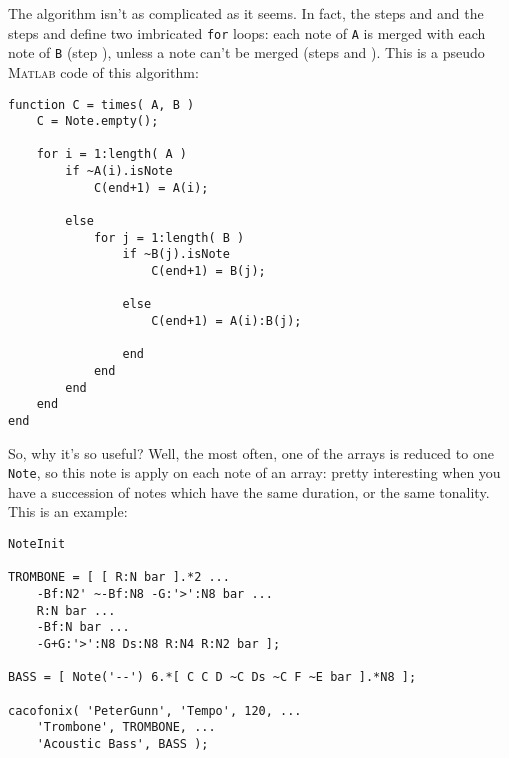 \documentclass{article}
\newcommand{\matlab}{\textsc{Matlab}\xspace}
\newcommand{\note}{\lstinline!Note!\xspace}
\newcommand{\titlealgo}{}
\newcommand{\stepref}[2][]{\ifthenelse{\equal{#1}{}}{\ref{Algo \titlealgo.Step #2}}{\ref{Algo #1.Step #2}}}
\begin{document}
The algorithm isn't as complicated as it seems. In fact, the steps \stepref[T]{checki} and \stepref[T]{inci} and the steps \stepref[T]{checkj} and \stepref[T]{incj} define two imbricated \lstinline!for! loops: each note of \lstinline!A! is merged with each note of \lstinline!B! (step \stepref[T]{addAiBj}), unless a note can't be merged (steps \stepref[T]{addAi} and \stepref[T]{addBj}). This is a pseudo \matlab code of this algorithm:
\begin{lstlisting}
function C = times( A, B )
	C = Note.empty();

	for i = 1:length( A )
		if ~A(i).isNote
			C(end+1) = A(i);

		else
			for j = 1:length( B )
				if ~B(j).isNote
					C(end+1) = B(j);

				else
					C(end+1) = A(i):B(j);

				end
			end
		end
	end
end
\end{lstlisting}

So, why it's so useful? Well, the most often, one of the arrays is reduced to one \note, so this note is apply on each note of an array: pretty interesting when you have a succession of notes which have the same duration, or the same tonality. This is an example:


\begin{lstlisting}
NoteInit

TROMBONE = [ [ R:N bar ].*2 ...
	-Bf:N2' ~-Bf:N8 -G:'>':N8 bar ...
	R:N bar ...
	-Bf:N bar ...
	-G+G:'>':N8 Ds:N8 R:N4 R:N2 bar ];

BASS = [ Note('--') 6.*[ C C D ~C Ds ~C F ~E bar ].*N8 ];

cacofonix( 'PeterGunn', 'Tempo', 120, ...
	'Trombone', TROMBONE, ...
	'Acoustic Bass', BASS );	
\end{lstlisting}
\end{document}
